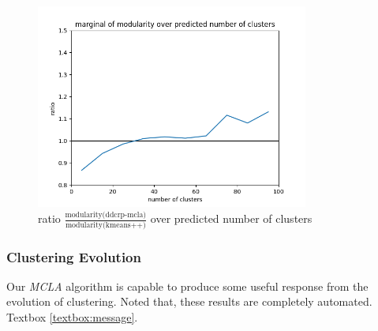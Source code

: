\begin{figure}
    \centering
    \includegraphics[width=0.8\textwidth]{report/assets/results/ratio_cluster_real.png}
    \caption{ratio $\frac{\text{modularity(ddcrp-mcla)}}{\text{modularity(kmeans++)}}$ over predicted number of clusters}
    \label{fig:ratio_cluster_real}
\end{figure}

\subsubsection{Clustering Evolution}

Our \emph{MCLA} algorithm is capable to produce some useful response from the evolution of clustering. Noted that, these results are completely automated. Textbox \ref{textbox:message}.


